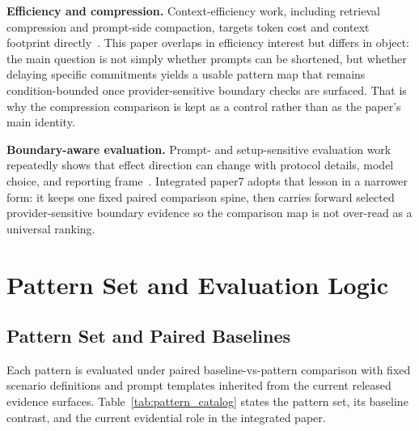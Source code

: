 \documentclass[11pt,a4paper]{article}
\begin{document}
\textbf{Efficiency and compression.}
Context-efficiency work, including retrieval compression and prompt-side compaction, targets token cost and context footprint directly~\cite{xu2023recomp,chevalier2023compress}. This paper overlaps in efficiency interest but differs in object: the main question is not simply whether prompts can be shortened, but whether delaying specific commitments yields a usable pattern map that remains condition-bounded once provider-sensitive boundary checks are surfaced. That is why the compression comparison is kept as a control rather than as the paper's main identity.

\textbf{Boundary-aware evaluation.}
Prompt- and setup-sensitive evaluation work repeatedly shows that effect direction can change with protocol details, model choice, and reporting frame~\cite{liang2022helm,zheng2023mtbench,dubois2024alpacaeval,kojima2022zeroshot,wang2023selfconsistency,zhao2021calibrate}. Integrated paper7 adopts that lesson in a narrower form: it keeps one fixed paired comparison spine, then carries forward selected provider-sensitive boundary evidence so the comparison map is not over-read as a universal ranking.

\section{Pattern Set and Evaluation Logic}
\label{sec:method}

\subsection{Pattern Set and Paired Baselines}

Each pattern is evaluated under paired baseline-vs-pattern comparison with fixed scenario definitions and prompt templates inherited from the current released evidence surfaces. Table~\ref{tab:pattern_catalog} states the pattern set, its baseline contrast, and the current evidential role in the integrated paper.
\end{document}
